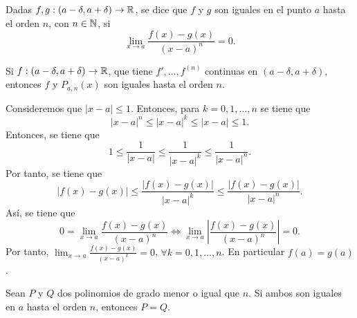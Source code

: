 \begin{fdefinition}[]
\normalfont Dadas $\displaystyle f,g : \left(a - \delta, a+ \delta \right) \to \mathbb{R} $, se dice que $\displaystyle f $ y $\displaystyle g $ son iguales en el punto $\displaystyle a $ hasta el orden $\displaystyle n $, con $\displaystyle n \in \mathbb{N} $, si 
\[\lim_{x \to a}\frac{f\left(x\right)-g\left(x\right)}{\left(x-a\right)^{n}} = 0 .\]
\end{fdefinition}
\begin{eg}
\normalfont Si $\displaystyle f : \left(a-\delta, a + \delta \right)\to \mathbb{R} $, que tiene $\displaystyle f', \ldots, f^{\left(n\right)} $ continuas en $\displaystyle \left(a-\delta, a + \delta \right) $, entonces $\displaystyle f $ y $\displaystyle P_{a,n}\left(x\right) $ son iguales hasta el orden $\displaystyle n $.
\end{eg}
\begin{observation}
\normalfont Consideremos que $\displaystyle \left|x-a\right| \leq 1 $. Entonces, para $\displaystyle k = 0, 1, \ldots, n $ se tiene que 
\[ \left|x-a\right|^{n} \leq \left|x-a\right|^{k} \leq \left|x-a\right| \leq 1 .\]
Entonces, se tiene que
\[ 1 \leq \frac{1}{ \left|x-a\right|} \leq \frac{1}{ \left|x-a\right|^{k}} \leq \frac{1}{ \left|x-a\right|^{n}} .\]
Por tanto, se tiene que
\[ \left|f\left(x\right)-g\left(x\right)\right| \leq \frac{ \left|f\left(x\right)-g\left(x\right)\right|}{ \left|x-a\right|^{k}} \leq \frac{ \left|f\left(x\right)-g\left(x\right)\right|}{ \left|x-a\right|^{n}} .\]
Así, se tiene que
\[0 = \lim_{x \to a}\frac{f\left(x\right)-g\left(x\right)}{ \left(x-a\right)^{n}} \iff \lim_{x \to a} \left|\frac{f\left(x\right)-g\left(x\right)}{\left(x-a\right)^{n}}\right| =0 .\]
Por tanto, $\displaystyle \lim_{x \to a}\frac{f\left(x\right)-g\left(x\right)}{ \left(x-a\right)^{k}} = 0 $, $\displaystyle \forall k = 0, 1, \ldots, n $. En particular $\displaystyle f\left(a\right) = g\left(a\right) $.
\end{observation}
\begin{flema}[]
\normalfont Sean $\displaystyle P $ y $\displaystyle Q $ dos polinomios de grado menor o igual que $\displaystyle n $. Si ambos son iguales en $\displaystyle a $ hasta el orden $\displaystyle n $, entonces $\displaystyle P = Q $.
\end{flema}
